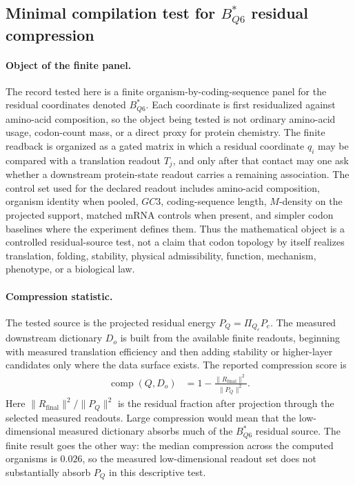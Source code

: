 
\subsection{Minimal compilation test for $B^*_{Q6}$ residual compression}
\label{sec:biorality-q6-minimal-compilation-test}

\paragraph{Object of the finite panel.}
The record tested here is a finite organism-by-coding-sequence panel for the residual coordinates denoted $B^*_{Q6}$.  Each coordinate is first residualized against amino-acid composition, so the object being tested is not ordinary amino-acid usage, codon-count mass, or a direct proxy for protein chemistry.  The finite readback is organized as a gated matrix in which a residual coordinate $q_i$ may be compared with a translation readout $T_j$, and only after that contact may one ask whether a downstream protein-state readout carries a remaining association.  The control set used for the declared readout includes amino-acid composition, organism identity when pooled, $GC3$, coding-sequence length, $M$-density on the projected support, matched mRNA controls when present, and simpler codon baselines where the experiment defines them.  Thus the mathematical object is a controlled residual-source test, not a claim that codon topology by itself realizes translation, folding, stability, physical admissibility, function, mechanism, phenotype, or a biological law.

\paragraph{Compression statistic.}
The tested source is the projected residual energy $P_Q = \Pi_{Q_e}P_e$.  The measured downstream dictionary $D_o$ is built from the available finite readouts, beginning with measured translation efficiency and then adding stability or higher-layer candidates only where the data surface exists.  The reported compression score is
$$
\begin{aligned}
\operatorname{comp}(Q,D_o)
  &= 1 - \frac{\lVert R_{\mathrm{final}}\rVert^2}{\lVert P_Q\rVert^2}.
\end{aligned}
$$
Here $\lVert R_{\mathrm{final}}\rVert^2/\lVert P_Q\rVert^2$ is the residual fraction after projection through the selected measured readouts.  Large compression would mean that the low-dimensional measured dictionary absorbs much of the $B^*_{Q6}$ residual source.  The finite result goes the other way: the median compression across the computed organisms is $0.026$, so the measured low-dimensional readout set does not substantially absorb $P_Q$ in this descriptive test.

